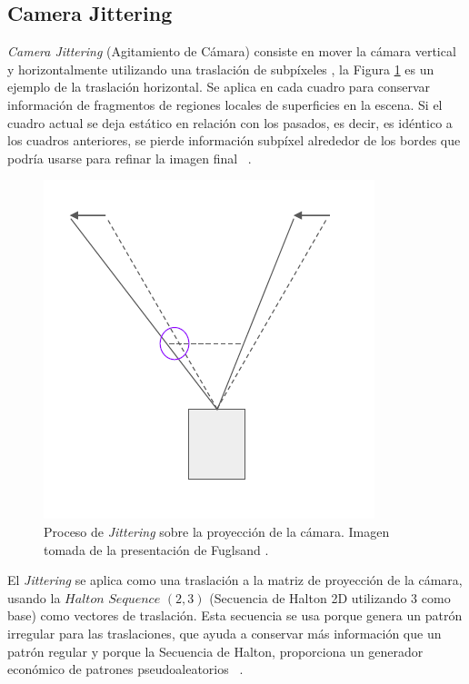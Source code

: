 \documentclass[pregrado]{tesis-usb} %
\begin{document}
\subsection{Camera Jittering}
\textit{Camera Jittering} (Agitamiento de Cámara) consiste en mover la cámara vertical y horizontalmente utilizando una traslación de subpíxeles \cite{Fuglsand2016,XU2016}, la Figura \ref{fig:camerajittering} es un ejemplo de la traslación horizontal. Se aplica en cada cuadro para conservar información de fragmentos de regiones locales de superficies en la escena. Si el cuadro actual se deja estático en relación con los pasados, es decir, es idéntico a los cuadros anteriores, se pierde información subpíxel alrededor de los bordes que podría usarse para refinar la imagen final ~\cite{Fuglsand2016, XU2016}.  

\begin{figure}[!hbt]
	\centering
	\includegraphics[scale=0.3]{images/camera_jitter.png}
	\caption{Proceso de \textit{Jittering} sobre la proyección de la cámara. Imagen tomada de la presentación de Fuglsand \protect\cite{Fuglsand2016}.} \label{fig:camerajittering}
\end{figure}

El \textit{Jittering} se aplica como una traslación a la matriz de proyección de la cámara, usando la $Halton$ $Sequence$ $(2,3)$ (Secuencia de Halton 2D utilizando 3 como base) como vectores de traslación. Esta secuencia se usa porque genera un patrón irregular para las traslaciones, que ayuda a conservar más información que un patrón regular y porque la Secuencia de Halton, proporciona un generador económico de patrones pseudoaleatorios ~\cite{Fuglsand2016, XU2016}. 
\end{document}

